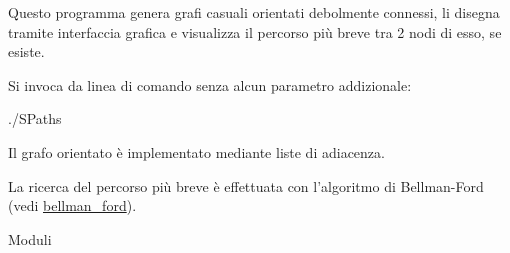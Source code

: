 Questo programma genera grafi casuali orientati debolmente connessi, li disegna tramite interfaccia grafica e visualizza il percorso più breve tra 2 nodi di esso, se esiste.\par


Si invoca da linea di comando senza alcun parametro addizionale\-:\par

\begin{DoxyItemize}
\item {\ttfamily }./\-S\-Paths

Il grafo orientato è implementato mediante liste di adiacenza.\par
 La ricerca del percorso più breve è effettuata con l'algoritmo di Bellman-\/\-Ford (vedi \hyperlink{operazioni__grafo_8h_a80eb34ff061292b73546e57d066265b6}{bellman\-\_\-ford}). \begin{DoxyParagraph}{Moduli}


\end{DoxyParagraph}
\end{DoxyItemize}
